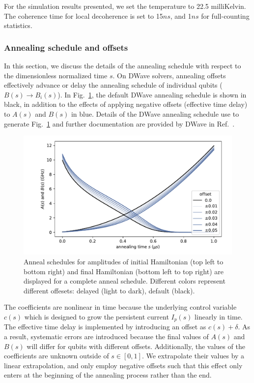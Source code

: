 \documentclass[prd,twocolumn,tightenlines,preprintnumbers,showpacs,superscriptaddress,notitlepage,nofootinbib,eqsecnum,floatfix,longbibliography,aps,10pt]{revtex4-2}
\begin{document}
For the simulation results presented, we set the temperature to 22.5 milliKelvin.
The coherence time for local decoherence is set to 15$ns$, and 1$ns$ for full-counting statistics.

\subsubsection{Annealing schedule and offsets}
\label{sec:methods:annealing-schedule}
In this section, we discuss the details of the annealing schedule with respect to the dimensionless normalized time $s$.
On DWave solvers, annealing offsets effectively advance or delay the annealing schedule of individual qubits ($B(s) \to B_i(s)$).
In Fig.~\ref{fig:anneal_schedule}, the default DWave annealing schedule is shown in black, in addition to the effects of applying negative offsets (effective time delay) to $A(s)$ and $B(s)$ in blue.
Details of the DWave annealing schedule use to generate Fig.~\ref{fig:anneal_schedule} and further documentation are provided by DWave in Ref.~\cite{dwave_as, dwave_as_docu}.

\begin{figure}[htb]
 \centering
  \includegraphics[width=\columnwidth]{./new_figures/anneal_schedule.pdf}
  \caption{
  Anneal schedules for amplitudes of initial Hamiltonian (top left to bottom right) and final Hamiltonian (bottom left to top right) are displayed for a complete anneal schedule.
  Different colors represent different offesets: delayed (light to dark), default (black).
 }
 \label{fig:anneal_schedule}
\end{figure}

The coefficients are nonlinear in time because the underlying control variable $c(s)$ which is designed to grow the persistent current $I_p(s)$ linearly in time.
The effective time delay is implemented by introducing an offset as $c(s) + \delta$.
As a result, systematic errors are introduced because the final values of $A(s)$ and $B(s)$ will differ for qubits with different offsets.
Additionally, the values of the coefficients are unknown outside of $s\in [0, 1]$.
We extrapolate their values by a linear extrapolation, and only employ negative offsets such that this effect only enters at the beginning of the annealing process rather than the end.
\end{document}
